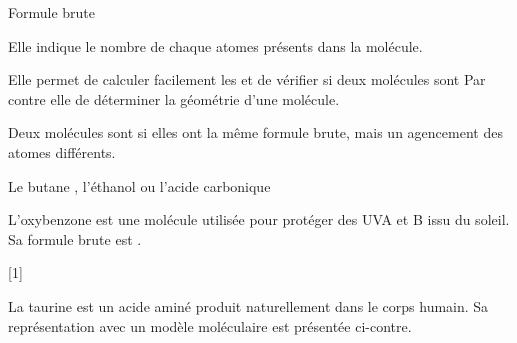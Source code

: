 %



\vspace*{-12pt}

\vspace*{-8pt}
\begin{doc}{Formule brute}
  \begin{importants}
    Elle indique le nombre de chaque atomes présents dans la molécule.
  \end{importants}
  Elle permet de calculer facilement les  et de vérifier si deux molécules sont 
  Par contre elle  de déterminer la géométrie d'une molécule.

  \begin{importants}
    Deux molécules sont  si elles ont la même formule brute, mais un agencement des atomes différents.
  \end{importants}

  \exemple Le butane , l'éthanol  ou l'acide carbonique 
\end{doc}

L'oxybenzone est une molécule utilisée pour protéger des UVA et B issu du soleil.
Sa formule brute est  .

[1]

\vspace*{8pt}
\begin{figure}
  \centering
  \vspace*{-22pt}
\end{figure}

La taurine est un acide aminé produit naturellement dans le corps humain.
Sa représentation avec un modèle moléculaire est présentée ci-contre.

